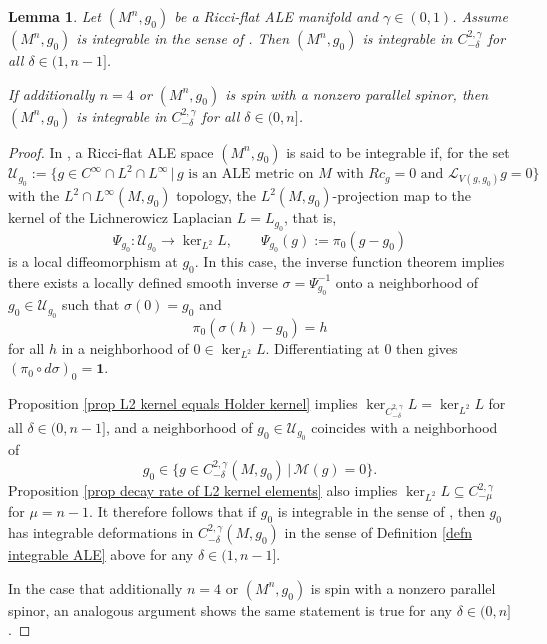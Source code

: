 \documentclass[12pt]{amsart}
\renewcommand{\1}{{\mathbf 1}}
\newtheorem{lemma}[thm]{Lemma}
\theoremstyle{others}
\numberwithin{equation}{section}
\begin{document}
\begin{lemma} \label{lem comparing integrability defns}
    Let $(M^n, g_0)$ be a Ricci-flat ALE manifold and $\gamma \in (0,1)$.
    Assume $(M^n, g_0)$ is integrable in the sense of \cite[Definition 2.4]{DeruelleKroncke20}.
    Then $(M^n, g_0)$ is integrable in $C^{2, \gamma}_{-\delta}$ for all $\delta \in (1, n-1]$.

    If additionally $n=4$ or $(M^n, g_0)$ is spin with a nonzero parallel spinor,
    then $(M^n, g_0)$ is integrable in $C^{2, \gamma}_{-\delta}$ for all $\delta \in (0, n]$.
\end{lemma}
\begin{proof}   
    In \cite[Definition 2.4]{DeruelleKroncke20}, a Ricci-flat ALE space $(M^n, g_0)$ is said to be integrable if, for the set
        $$\mathcal U_{g_0} := \{ g \in C^\infty \cap L^2 \cap L^\infty \, | \, \text{$g$ is an ALE metric on $M$ with } Rc_g = 0 \text{ and } \mathcal L_{V(g, g_0)} g = 0 \}$$ 
    with the $L^2 \cap L^\infty(M, g_0)$ topology,
    the $L^2(M,g_0)$-projection map to the kernel of the Lichnerowicz Laplacian $L = L_{g_0}$, that is,
        $$\Psi_{g_0} : \mathcal U_{g_0} \to \ker_{L^2} L , \qquad \Psi_{g_0} (g) := \pi_0 ( g - g_0)$$
    is a local diffeomorphism at $g_0$.
    In this case, the inverse function theorem implies there exists a locally defined smooth inverse $\sigma = \Psi_{g_0}^{-1}$ onto a neighborhood of $g_0 \in \mathcal U_{g_0}$ such that $\sigma(0) = g_0$ and 
        $$\pi_0 ( \sigma(h) - g_0) = h$$
    for all $h $ in a neighborhood of $0\in \ker_{L^2} L$.
    Differentiating at $0$ then gives $(\pi_0 \circ d\sigma)_0 = \mathbf 1$.
    
    Proposition \ref{prop L2 kernel equals Holder kernel} implies $\ker_{C^{2, \gamma}_{-\delta} } L = \ker_{L^2} L $ for all $\delta \in (0, n-1]$, and a neighborhood of $g_0 \in \mathcal U_{g_0}$ coincides with a neighborhood of 
        $$g_0 \in \{ g \in C^{2, \gamma}_{-\delta} (M, g_0) \, | \, \mathcal M(g) = 0\}.$$
    Proposition \ref{prop decay rate of L2 kernel elements} also implies $\ker_{L^2} L \subseteq C^{2, \gamma}_{-\mu}$ for $\mu = n-1$.
    It therefore follows that if $g_0$ is integrable in the sense of \cite[Definition 2.4]{DeruelleKroncke20}, then $g_0$ has integrable deformations in $C^{2, \gamma}_{-\delta}(M, g_0)$ in the sense of Definition \ref{defn integrable ALE} above for any $\delta \in (1, n-1]$.
    
    In the case that additionally $n=4$ or $(M^n,g_0)$ is spin with a nonzero parallel spinor, an analogous argument shows the same statement is true for any $\delta \in (0, n]$.
\end{proof} 
\end{document}
